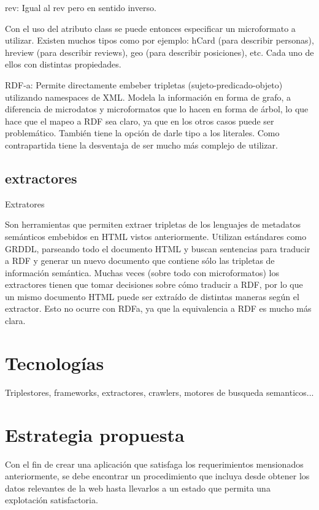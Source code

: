 rev: Igual al rev pero en sentido inverso.

Con el uso del atributo class se puede entonces especificar un microformato a utilizar. Existen muchos tipos como por ejemplo: hCard (para describir 
personas), hreview (para describir reviews), geo (para describir posiciones), etc. Cada uno de ellos con distintas propiedades.


RDF-a: Permite directamente embeber tripletas (sujeto-predicado-objeto) utilizando namespaces de XML. Modela la información en forma de grafo, 
a diferencia de microdatos y microformatos que lo hacen en forma de árbol, lo que hace que el mapeo a RDF sea claro, ya que en los otros casos puede ser problemático.
También tiene la opción de darle tipo a los literales. Como contrapartida tiene la desventaja de ser mucho más complejo de utilizar. 

\subsection{extractores}

Extratores

Son herramientas que permiten extraer tripletas de los lenguajes de metadatos semánticos embebidos en HTML vistos anteriormente. 
Utilizan estándares como GRDDL, parseando todo el documento HTML y buscan sentencias para traducir a RDF y generar un nuevo documento 
que contiene sólo las tripletas de información semántica. 
Muchas veces (sobre todo con microformatos) los extractores tienen que tomar decisiones sobre cómo traducir a RDF, por lo que 
un mismo documento HTML puede ser extraído de distintas maneras según el extractor. Esto no ocurre con RDFa, ya que la equivalencia a RDF es mucho 
más clara.

\section{Tecnologías}
Triplestores, frameworks, extractores, crawlers, motores de busqueda semanticos...

\section{Estrategia propuesta}
Con el fin de crear una aplicación que satisfaga los requerimientos mensionados anteriormente, se debe encontrar
un procedimiento que incluya desde obtener los datos relevantes de la web hasta llevarlos a un estado que permita una 
explotación satisfactoria. 

